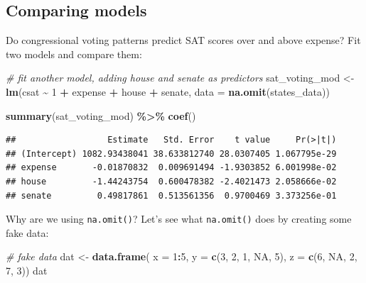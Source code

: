 \documentclass[
]{book}
\newenvironment{Shaded}{\begin{snugshade}}{\end{snugshade}}
\newcommand{\CommentTok}[1]{\textcolor[rgb]{0.56,0.35,0.01}{\textit{#1}}}
\newcommand{\DataTypeTok}[1]{\textcolor[rgb]{0.13,0.29,0.53}{#1}}
\newcommand{\DecValTok}[1]{\textcolor[rgb]{0.00,0.00,0.81}{#1}}
\newcommand{\KeywordTok}[1]{\textcolor[rgb]{0.13,0.29,0.53}{\textbf{#1}}}
\newcommand{\NormalTok}[1]{#1}
\newcommand{\OperatorTok}[1]{\textcolor[rgb]{0.81,0.36,0.00}{\textbf{#1}}}
\newcommand{\OtherTok}[1]{\textcolor[rgb]{0.56,0.35,0.01}{#1}}
\newcommand{\StringTok}[1]{\textcolor[rgb]{0.31,0.60,0.02}{#1}}
\begin{document}
\hypertarget{comparing-models}{%
\subsection{Comparing models}\label{comparing-models}}

Do congressional voting patterns predict SAT scores over and above expense? Fit two models and compare them:

\begin{Shaded}
\begin{Highlighting}[]
  \CommentTok{\# fit another model, adding house and senate as predictors}
\NormalTok{  sat\_voting\_mod \textless{}{-}}\StringTok{ }\KeywordTok{lm}\NormalTok{(csat }\OperatorTok{\textasciitilde{}}\StringTok{ }\DecValTok{1} \OperatorTok{+}\StringTok{ }\NormalTok{expense }\OperatorTok{+}\StringTok{ }\NormalTok{house }\OperatorTok{+}\StringTok{ }\NormalTok{senate,}
                        \DataTypeTok{data =} \KeywordTok{na.omit}\NormalTok{(states\_data))}

  \KeywordTok{summary}\NormalTok{(sat\_voting\_mod) }\OperatorTok{\%\textgreater{}\%}\StringTok{ }\KeywordTok{coef}\NormalTok{()}
\end{Highlighting}
\end{Shaded}

\begin{verbatim}
##                  Estimate   Std. Error    t value     Pr(>|t|)
## (Intercept) 1082.93438041 38.633812740 28.0307405 1.067795e-29
## expense       -0.01870832  0.009691494 -1.9303852 6.001998e-02
## house         -1.44243754  0.600478382 -2.4021473 2.058666e-02
## senate         0.49817861  0.513561356  0.9700469 3.373256e-01
\end{verbatim}

Why are we using \texttt{na.omit()}? Let's see what \texttt{na.omit()} does by creating some fake data:

\begin{Shaded}
\begin{Highlighting}[]
\CommentTok{\# fake data}
\NormalTok{dat \textless{}{-}}\StringTok{ }\KeywordTok{data.frame}\NormalTok{(}
  \DataTypeTok{x =} \DecValTok{1}\OperatorTok{:}\DecValTok{5}\NormalTok{,}
  \DataTypeTok{y =} \KeywordTok{c}\NormalTok{(}\DecValTok{3}\NormalTok{, }\DecValTok{2}\NormalTok{, }\DecValTok{1}\NormalTok{, }\OtherTok{NA}\NormalTok{, }\DecValTok{5}\NormalTok{),}
  \DataTypeTok{z =} \KeywordTok{c}\NormalTok{(}\DecValTok{6}\NormalTok{, }\OtherTok{NA}\NormalTok{, }\DecValTok{2}\NormalTok{, }\DecValTok{7}\NormalTok{, }\DecValTok{3}\NormalTok{))}
\NormalTok{dat}
\end{Highlighting}
\end{Shaded}
\end{document}
